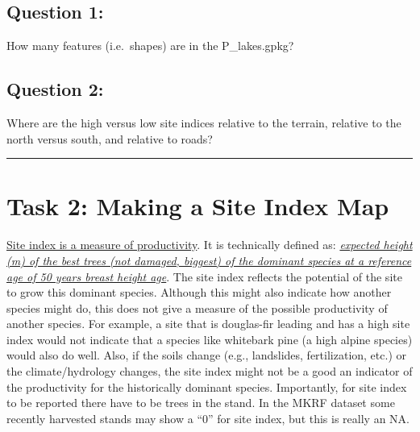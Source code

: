 \documentclass[
  letterpaper,
]{book}
\begin{document}
\hypertarget{question-1}{%
\subsection*{Question 1:}\label{question-1}}

How many features (i.e.~shapes) are in the P\_lakes.gpkg?

\hypertarget{question-2}{%
\subsection*{Question 2:}\label{question-2}}

Where are the high versus low site indices relative to the terrain,
relative to the north versus south, and relative to roads?

\begin{center}\rule{0.5\linewidth}{0.5pt}\end{center}

\hypertarget{task-2-making-a-site-index-map}{%
\section*{Task 2: Making a Site Index
Map}\label{task-2-making-a-site-index-map}}


\ul{Site index is a measure of productivity}. It is technically defined
as: \ul{\emph{expected height (m) of the best trees (not damaged,
biggest) of the dominant species at a reference age of 50 years breast
height age}}. The site index reflects the potential of the site to grow
this dominant species. Although this might also indicate how another
species might do, this does not give a measure of the possible
productivity of another species. For example, a site that is douglas-fir
leading and has a high site index would not indicate that a species like
whitebark pine (a high alpine species) would also do well. Also, if the
soils change (e.g., landslides, fertilization, etc.) or the
climate/hydrology changes, the site index might not be a good an
indicator of the productivity for the historically dominant species.
Importantly, for site index to be reported there have to be trees in the
stand. In the MKRF dataset some recently harvested stands may show a
``0'' for site index, but this is really an NA.
\end{document}
